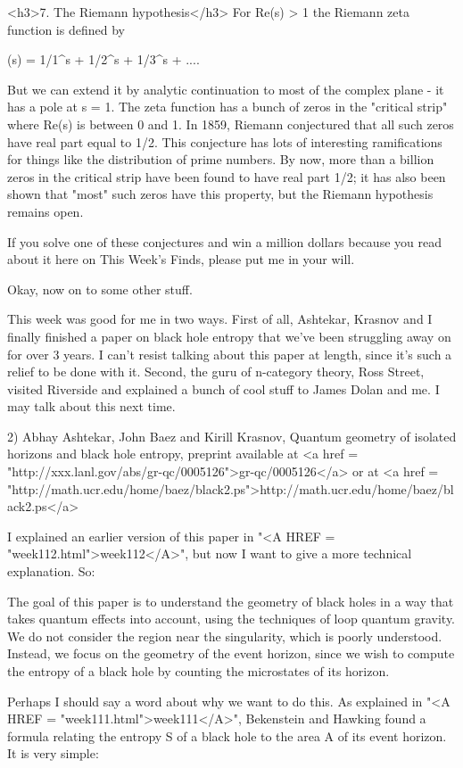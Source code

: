 <h3>7. The Riemann hypothesis</h3>
For Re(s) > 1 the Riemann zeta function is defined by 

\zeta (s) = 1/1^{s} + 1/2^{s} + 1/3^{s} + ....


But we can extend it by analytic continuation to most
of the complex plane - it has a pole at s = 1.
The zeta function has a bunch of zeros in the "critical strip" where
Re(s) is between 0 and 1. In 1859, Riemann conjectured that all such zeros
have real part equal to 1/2. This conjecture has lots of interesting 
ramifications
for things like the distribution of prime numbers. By now, more than a
billion zeros in the critical strip have been found to have real part 1/2;
it has also been shown that "most" such zeros have this property, but the
Riemann hypothesis remains open.

If you solve one of these conjectures and win a million dollars because
you read about it here on This Week's Finds, please put me in your will.

Okay, now on to some other stuff.

This week was good for me in two ways.  First of all, Ashtekar, Krasnov
and I finally finished a paper on black hole entropy that we've been
struggling away on for over 3 years.  I can't resist talking about this
paper at length, since it's such a relief to be done with it.  Second, 
the guru of n-category theory, Ross Street, visited Riverside and explained 
a bunch of cool stuff to James Dolan and me.  I may talk about this next
time.  

2) Abhay Ashtekar, John Baez and Kirill Krasnov, Quantum geometry of
isolated horizons and black hole entropy, preprint available at 
<a href = "http://xxx.lanl.gov/abs/gr-qc/0005126">gr-qc/0005126</a>
or at <a href = "http://math.ucr.edu/home/baez/black2.ps">http://math.ucr.edu/home/baez/black2.ps</a>

I explained an earlier version of this paper in "<A HREF = "week112.html">week112</A>", but now I
want to give a more technical explanation.  So:

The goal of this paper is to understand the geometry of black holes in a
way that takes quantum effects into account, using the techniques of
loop quantum gravity.  We do not consider the region near the singularity, 
which is poorly understood.  Instead, we focus on the geometry of the
event horizon, since we wish to compute the entropy of a black hole by
counting the microstates of its horizon.  

Perhaps I should say a word about why we want to do this.  As explained
in "<A HREF = "week111.html">week111</A>", Bekenstein and Hawking found a formula relating the
entropy S of a black hole to the area A of its event horizon.  It is
very simple:

